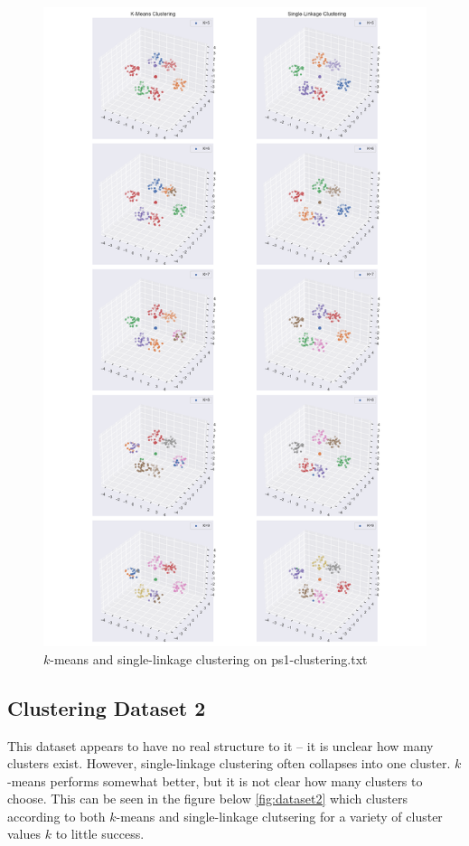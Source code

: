 \documentclass{article}
\begin{document}
        \begin{figure}[]
            \label{fig:dataset1}
            \includegraphics[width=0.90\linewidth]{images/q4/clustering-dataset1.png}
            \caption{$k$-means and single-linkage clustering on ps1-clustering.txt}
        \end{figure}
        \newpage

    \subsection[short]{Clustering Dataset 2}

        This dataset appears to have no real structure to it -- it is unclear how many clusters exist. However, single-linkage clustering often collapses into one cluster. $k$-means performs somewhat better, but it is not clear how many clusters to choose. This can be seen in the figure below \ref{fig:dataset2} which clusters according to both $k$-means and single-linkage clutsering for a variety of cluster values $k$ to little success.
\end{document}
